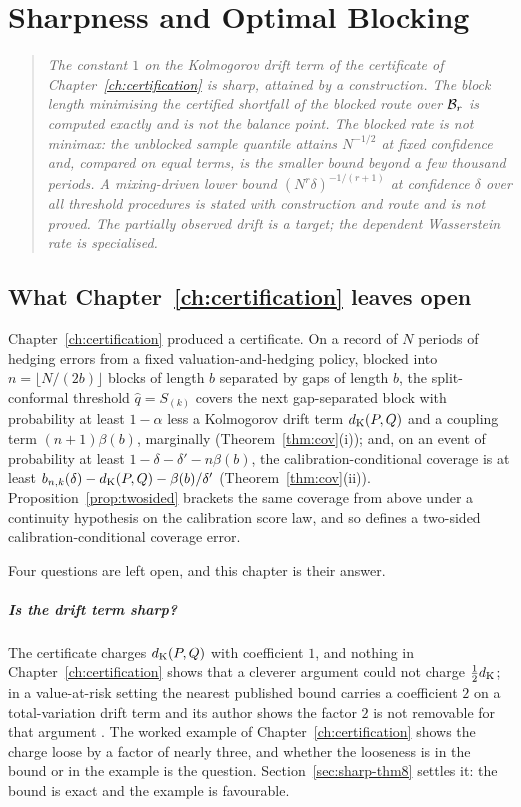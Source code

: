 \documentclass[../../../main.tex]{subfiles}
\begin{document}
\chapter{Sharpness and Optimal Blocking}\label{ch4-sharpness-blocking}\label{ch:sharpness}

\begin{quote}\itshape
The constant $1$ on the Kolmogorov drift term of the certificate of Chapter~\ref{ch:certification} is sharp, attained by a construction. The block length minimising the certified shortfall of the blocked route over $\mathcal B_{r}$ is computed exactly and is not the balance point. The blocked rate is not minimax: the unblocked sample quantile attains $N^{-1/2}$ at fixed confidence and, compared on equal terms, is the smaller bound beyond a few thousand periods. A mixing-driven lower bound $(N^r\delta)^{-1/(r+1)}$ at confidence $\delta$ over all threshold procedures is stated with construction and route and is not proved. The partially observed drift is a target; the dependent Wasserstein rate is specialised.
\end{quote}

\section{What Chapter~\ref{ch:certification} leaves open}\label{sec:sharp-intro}

Chapter~\ref{ch:certification} produced a certificate. On a record of $N$ periods of hedging errors from a fixed valuation-and-hedging policy, blocked into $n=\lfloor N/(2b)\rfloor$ blocks of length $b$ separated by gaps of length $b$, the split-conformal threshold $\hat q=S_{(k)}$ covers the next gap-separated block with probability at least $1-\alpha$ less a Kolmogorov drift term $d_{\mathrm{K}}(P,Q)$ and a coupling term $(n+1)\beta(b)$, marginally (Theorem~\ref{thm:cov}(i)); and, on an event of probability at least $1-\delta-\delta'-n\beta(b)$, the calibration-conditional coverage is at least $b_{n,k}(\delta)-d_{\mathrm{K}}(P,Q)-\beta(b)/\delta'$ (Theorem~\ref{thm:cov}(ii)). Proposition~\ref{prop:twosided} brackets the same coverage from above under a continuity hypothesis on the calibration score law, and so defines a two-sided calibration-conditional coverage error.

Four questions are left open, and this chapter is their answer.

\paragraph{Is the drift term sharp?} The certificate charges $d_{\mathrm{K}}(P,Q)$ with coefficient $1$, and nothing in Chapter~\ref{ch:certification} shows that a cleverer argument could not charge $\tfrac12d_{\mathrm{K}}$; in a value-at-risk setting the nearest published bound carries a coefficient $2$ on a total-variation drift term and its author shows the factor $2$ is not removable for that argument \citep[p.~3]{schmitt2026}. The worked example of Chapter~\ref{ch:certification} shows the charge loose by a factor of nearly three, and whether the looseness is in the bound or in the example is the question. Section~\ref{sec:sharp-thm8} settles it: the bound is exact and the example is favourable.
\end{document}
